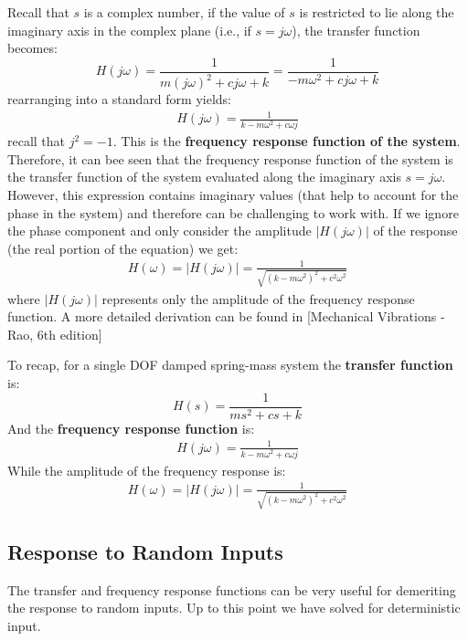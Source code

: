 \documentclass[12pt,a4paper]{article}
\begin{document}
Recall that $s$ is a complex number, if the value of $s$ is restricted to lie along the imaginary axis in the complex plane (i.e., if $s = j\omega$), the transfer function becomes:
\begin{equation}
H(j\omega) = \frac{1}{m(j\omega)^2+cj\omega+k} = \frac{1}{-m\omega^2+cj\omega+k} 
\end{equation}
rearranging into a standard form yields:
\begin{eqnarray}
H(j\omega) = \frac{1}{k-m\omega^2+c\omega j}
\end{eqnarray}
recall that $j^2=-1$. This is the \textbf{frequency response function of the system}. Therefore, it can bee seen that the frequency response function of the system is the transfer function of the system evaluated along the imaginary axis $s=j\omega$. However, this expression contains imaginary values (that help to account for the phase in the system) and therefore can be challenging to work with. If we ignore the phase component and only consider the amplitude $|H(j\omega)|$ of the response (the real portion of the equation) we get:
\begin{eqnarray}
H(\omega) = |H(j\omega)| = \frac{1}{\sqrt{(k-m\omega^2)^2+c^2\omega^2}}
\end{eqnarray}
where $|H(j\omega)|$ represents only the amplitude of the frequency response function. A more detailed derivation can be found in [Mechanical Vibrations - Rao, 6th edition]



To recap, for a single DOF damped spring-mass system the \textbf{transfer function} is:
\begin{equation}
H(s) = \frac{1}{ms^2+cs+k}
\end{equation}
And the \textbf{frequency response function} is:
\begin{eqnarray}
H(j\omega) = \frac{1}{k-m\omega^2+c\omega j}
\end{eqnarray}
While the amplitude of the frequency response is:
\begin{eqnarray}
H(\omega) = |H(j\omega)| = \frac{1}{\sqrt{(k-m\omega^2)^2+c^2\omega^2}}
\end{eqnarray}




\subsection*{Response to Random Inputs}
The transfer and frequency response functions can be very useful for demeriting the response to random inputs. Up to this point we have solved for deterministic input. 
\end{document}

